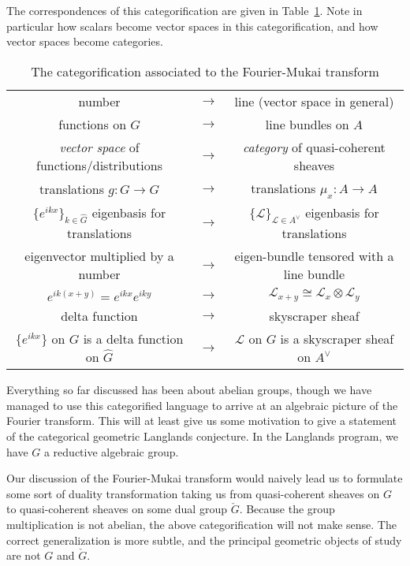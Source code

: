 The correspondences of this categorification are given in Table~\ref{tab:fourier_mukai}. Note in particular how scalars become vector spaces in this categorification, and how vector spaces become categories. 
\begin{table}
	\centering
	\begin{tabular}{c c  c}
		number & $\to$ & line (vector space in general)\\
		functions on $G$ & $\to$ & line bundles on $A$\\
		\emph{vector space} of functions/distributions & $\to$ & \emph{category} of quasi-coherent sheaves\\
		translations $g: G \to G$ & $\to$ & translations $\mu_x: A \to A$\\
		$\{e^{ikx}\}_{k \in \hat G}$ eigenbasis for translations & $\to$ & $
		\{\mathcal L\}_{\mathcal L \in A^\vee}$ eigenbasis for translations\\
		eigenvector multiplied by a number & $\to$ & eigen-bundle tensored with a line bundle\\
		$e^{ik(x+y)} = e^{ikx} e^{iky}$ & $\to$ & $\mathcal L_{x+y} \cong \mathcal L_x \otimes \mathcal L_y$\\
		delta function & $\to$ & skyscraper sheaf\\
		$\{e^{ikx}\}$ on $G$ is a delta function on $\hat G$ & $\to$ & $\mathcal L$ on $G$ is a skyscraper sheaf on $A^\vee$
	\end{tabular}
	\caption{The categorification associated to the Fourier-Mukai transform}
	\label{tab:fourier_mukai}
\end{table}
 
Everything so far discussed has been about abelian groups, though we have managed to use this categorified language to arrive at an algebraic picture of the Fourier transform. This will at least give us some motivation to give a statement of the categorical geometric Langlands conjecture. In the Langlands program, we have $G$ a reductive algebraic group. 

Our discussion of the Fourier-Mukai transform would naively lead us to formulate some sort of duality transformation taking us from quasi-coherent sheaves on $G$ to quasi-coherent sheaves on some dual group $\check G$. Because the group multiplication is not abelian, the above categorification will not make sense. The correct generalization is more subtle, and the principal geometric objects of study are not $G$ and $\check G$.

